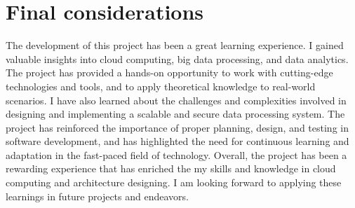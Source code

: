 \section{Final considerations}

The development of this project has been a great learning experience. I gained valuable insights into cloud computing, big data processing, and data analytics. The project has provided a hands-on opportunity to work with cutting-edge technologies and tools, and to apply theoretical knowledge to real-world scenarios. I have also learned about the challenges and complexities involved in designing and implementing a scalable and secure data processing system. The project has reinforced the importance of proper planning, design, and testing in software development, and has highlighted the need for continuous learning and adaptation in the fast-paced field of technology. Overall, the project has been a rewarding experience that has enriched the my skills and knowledge in cloud computing and architecture designing. I am looking forward to applying these learnings in future projects and endeavors.
